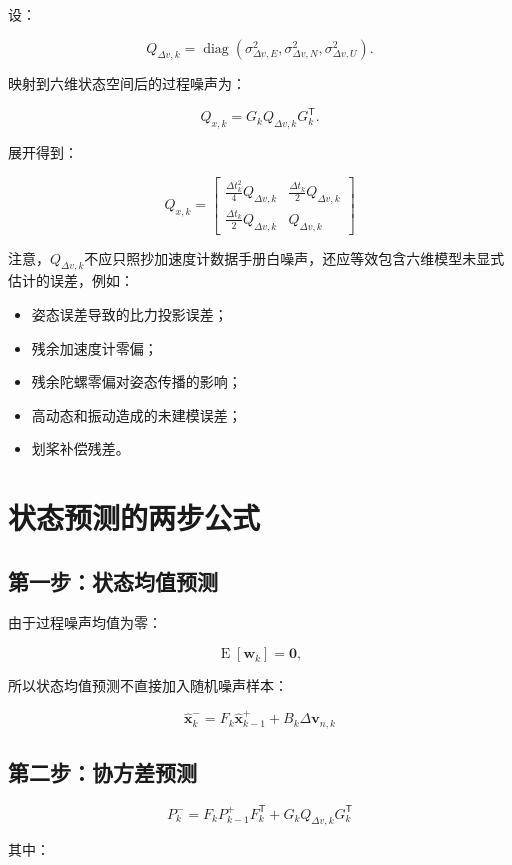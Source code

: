 \documentclass[12pt,a4paper]{ctexart}
\newcommand{\zero}{\mathbf 0}
\newcommand{\xhat}{\hat{\mathbf x}}
\newcommand{\transpose}{^{\mathsf T}}
\newcommand{\E}{\operatorname{E}}
\newcommand{\diag}{\operatorname{diag}}
\begin{document}
设：

\[
Q_{\Delta v,k}
=
\diag\left(
\sigma_{\Delta v,E}^2,
\sigma_{\Delta v,N}^2,
\sigma_{\Delta v,U}^2
\right).
\]

映射到六维状态空间后的过程噪声为：

\[
Q_{x,k}
=
G_kQ_{\Delta v,k}G_k\transpose.
\]

展开得到：

\[
\boxed{
Q_{x,k}
=
\begin{bmatrix}
\frac{\Delta t_k^2}{4}Q_{\Delta v,k}
&
\frac{\Delta t_k}{2}Q_{\Delta v,k}\\[4pt]
\frac{\Delta t_k}{2}Q_{\Delta v,k}
&
Q_{\Delta v,k}
\end{bmatrix}
}
\]

注意，$Q_{\Delta v,k}$不应只照抄加速度计数据手册白噪声，还应等效包含六维模型未显式估计的误差，例如：

\begin{itemize}[leftmargin=2em]
  \item 姿态误差导致的比力投影误差；
  \item 残余加速度计零偏；
  \item 残余陀螺零偏对姿态传播的影响；
  \item 高动态和振动造成的未建模误差；
  \item 划桨补偿残差。
\end{itemize}

\section{状态预测的两步公式}

\subsection{第一步：状态均值预测}

由于过程噪声均值为零：

\[
\E[\mathbf w_k]=\zero,
\]

所以状态均值预测不直接加入随机噪声样本：

\[
\boxed{
\xhat_k^- =
F_k\xhat_{k-1}^+
+
B_k\Delta\mathbf v_{n,k}
}
\]

\subsection{第二步：协方差预测}

\[
\boxed{
P_k^- =
F_kP_{k-1}^+F_k\transpose
+
G_kQ_{\Delta v,k}G_k\transpose
}
\]

其中：
\end{document}
